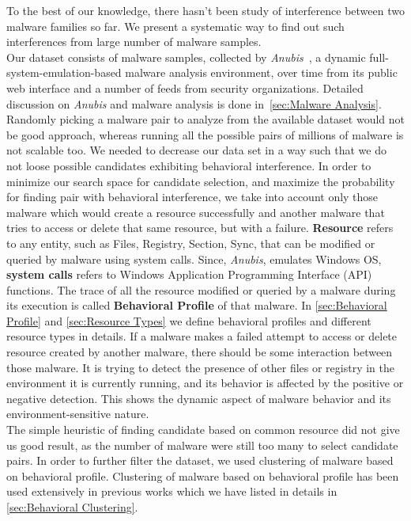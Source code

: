 To the best of our knowledge, there hasn't been study of interference between two malware families so far.
We present a systematic way to find out such interferences from large number of malware samples.\\
Our dataset consists of {\gettotalmalwarei{}} malware samples, collected by \emph{Anubis}~\cite[]{anubis}, a dynamic full-system-emulation-based malware analysis environment, over time from its public web interface and a number of feeds from security organizations.
Detailed discussion on \emph{Anubis} and malware analysis is done in~\autoref{sec:Malware Analysis}.
Randomly picking a malware pair to analyze from the available dataset would not be good approach, whereas running all the possible pairs of millions of malware is not scalable too.
We needed to decrease our data set in a way such that we do not loose possible candidates exhibiting behavioral interference.
In order to minimize our search space for candidate selection, and maximize the probability for finding pair with behavioral interference, we take into account only those malware which would create a resource successfully and another malware that tries to access or delete that same resource, but with a failure.
\textbf{Resource} refers to any entity, such as Files, Registry, Section, Sync, that can be modified or queried by malware using system calls.
Since, \emph{Anubis}, emulates Windows OS, \textbf{system calls} refers to Windows Application Programming Interface (API) functions.
The trace of all the resource modified or queried by a malware during its execution is called \textbf{Behavioral Profile} of that malware.
In \autoref{sec:Behavioral Profile} and \autoref{sec:Resource Types} we define behavioral profiles and different resource types in details.
If a malware makes a failed attempt to access or delete resource created by another malware, there should be some interaction between those malware.
It is trying to detect the presence of other files or registry in the environment it is currently running, and its behavior is affected by the positive or negative detection.
This shows the dynamic aspect of malware behavior and its environment-sensitive nature.\\
The simple heuristic of finding candidate based on common resource did not give us good result, as the number of malware were still too many to select candidate pairs.
In order to further filter the dataset, we used clustering of malware based on behavioral profile.
Clustering of malware based on behavioral profile has been used extensively in previous works which we have listed in details in \autoref{sec:Behavioral Clustering}.
